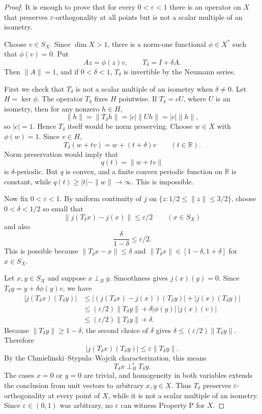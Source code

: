 \documentclass[11pt]{article}
\newcommand{\eps}{\varepsilon}
\newcommand{\R}{\mathbb R}
\begin{document}
\begin{proof}
It is enough to prove that for every \(0<\eps<1\) there is an operator on \(X\)
that preserves \(\eps\)-orthogonality at all points but is not a scalar multiple
of an isometry.

Choose \(v\in S_X\).  Since \(\dim X>1\), there is a norm-one functional
\(\phi\in X^*\) such that \(\phi(v)=0\).  Put
\[
  A z=\phi(z)v,\qquad T_\delta=I+\delta A .
\]
Then \(\|A\|=1\), and if \(0<\delta<1\), \(T_\delta\) is invertible by the
Neumann series.

First we check that \(T_\delta\) is not a scalar multiple of an isometry when
\(\delta\neq0\).  Let \(H=\ker\phi\).  The operator \(T_\delta\) fixes \(H\)
pointwise.  If \(T_\delta=cU\), where \(U\) is an isometry, then for any nonzero
\(h\in H\),
\[
  \|h\|=\|T_\delta h\|=|c|\|Uh\|=|c|\|h\|,
\]
so \(|c|=1\).  Hence \(T_\delta\) itself would be norm preserving.  Choose
\(w\in X\) with \(\phi(w)=1\).  Since \(v\in H\),
\[
  T_\delta(w+tv)=w+(t+\delta)v\qquad(t\in\R).
\]
Norm preservation would imply that
\[
  q(t)=\|w+tv\|
\]
is \(\delta\)-periodic.  But \(q\) is convex, and a finite convex periodic
function on \(\R\) is constant, while \(q(t)\geq |t|-\|w\|\to\infty\).  This is
impossible.

Now fix \(0<\eps<1\).  By uniform continuity of \(j\) on
\(\{z:1/2\leq\|z\|\leq3/2\}\), choose \(0<\delta<1/2\) so small that
\[
  \|j(T_\delta x)-j(x)\|\leq \eps/2 \qquad(x\in S_X)
\]
and also
\[
  \frac{\delta}{1-\delta}\leq \eps/2 .
\]
This is possible because \(\|T_\delta x-x\|\leq\delta\) and
\(\|T_\delta x\|\in[1-\delta,1+\delta]\) for \(x\in S_X\).

Let \(x,y\in S_X\) and suppose \(x\perp_B y\).  Smoothness gives
\(j(x)(y)=0\).  Since \(T_\delta y=y+\delta\phi(y)v\), we have
\[
\begin{aligned}
 |j(T_\delta x)(T_\delta y)|
 &\leq |(j(T_\delta x)-j(x))(T_\delta y)|+|j(x)(T_\delta y)| \\
 &\leq (\eps/2)\|T_\delta y\|+\delta |\phi(y)|\,|j(x)(v)| \\
 &\leq (\eps/2)\|T_\delta y\|+\delta .
\end{aligned}
\]
Because \(\|T_\delta y\|\geq 1-\delta\), the second choice of \(\delta\) gives
\(\delta\leq(\eps/2)\|T_\delta y\|\).  Therefore
\[
  |j(T_\delta x)(T_\delta y)|\leq \eps\|T_\delta y\|.
\]
By the Chmielinski--Stypula--Wojcik characterization, this means
\[
  T_\delta x\perp_B^\eps T_\delta y .
\]
The cases \(x=0\) or \(y=0\) are trivial, and homogeneity in both variables
extends the conclusion from unit vectors to arbitrary \(x,y\in X\).  Thus
\(T_\delta\) preserves \(\eps\)-orthogonality at every point of \(X\), while it
is not a scalar multiple of an isometry.  Since \(\eps\in(0,1)\) was arbitrary,
no \(\eps\) can witness Property P for \(X\).
\end{proof}
\end{document}
